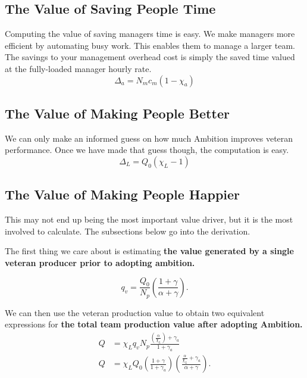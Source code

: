 \documentclass[paper=a4, fontsize=11pt abstract]{scrartcl}
\numberwithin{equation}{section}		%
\numberwithin{figure}{section}			%
\numberwithin{table}{section}				%
\begin{document}
\subsection{The Value of Saving People Time}
Computing the value of saving managers time is easy.
We make managers more efficient by automating busy work.
This enables them to manage a larger team.
The savings to your management overhead cost is simply the saved time valued at the fully-loaded manager hourly rate.
\begin{equation}
    \Delta_a = N_m c_m \left(1 - \chi_a\right)
\end{equation}


\subsection{The Value of Making People Better}
We can only make an informed guess on how much Ambition improves veteran performance.
Once we have made that guess though, the computation is easy.
\begin{equation}
    \Delta_L = Q_0\left(\chi_L - 1\right)
\end{equation}


\subsection{The Value of Making People Happier}
This may not end up being the most important value driver, but it is the most involved to calculate.
The subsections below go into the derivation.

The first thing we care about is estimating \textbf{the value generated by a single veteran producer prior to adopting ambition.}

\begin{equation}
    q_{v} = \frac{Q_0}{N_p}\left(\frac{1 + \gamma}{\alpha + \gamma}\right).
\end{equation}

We can then use the veteran production value to obtain two equivalent expressions for \textbf{the total team production value after adopting Ambition.}
\begin{align}
    Q &= \chi_L q_{v} N_p\frac{\left(\frac{\alpha}{\chi_L}\right) + \gamma_a}{1 + \gamma_a} \label{Q0} \\
    Q &= \chi_L Q_0  \left(\frac{1+\gamma}{1 + \gamma_a}\right) \left(\frac{\frac{\alpha}{\chi_L} + \gamma_a  }{\alpha + \gamma}\right).
\end{align}
\end{document}
